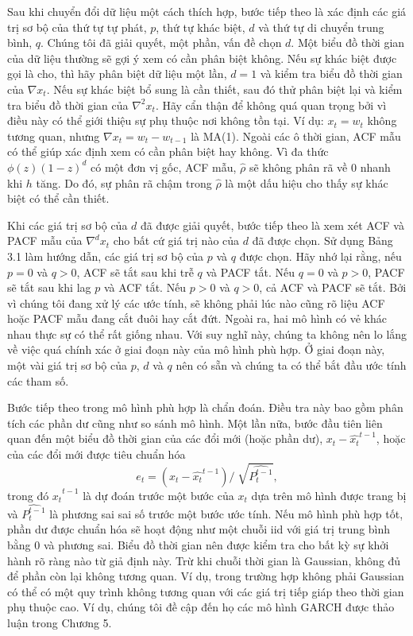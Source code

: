 \documentclass[12pt, a4paper,oneside]{book}
\theoremstyle{definition}
\begin{document}
Sau khi chuyển đổi dữ liệu một cách thích hợp, bước tiếp theo là xác định các giá trị sơ bộ của thứ tự tự phát, $p$, thứ tự khác biệt, $d$ và thứ tự di chuyển trung bình, $q$. Chúng tôi đã giải quyết, một phần, vấn đề chọn $d$. Một biểu đồ thời gian của dữ liệu thường sẽ gợi ý xem có cần phân biệt không. Nếu sự khác biệt được gọi là cho, thì hãy phân biệt dữ liệu một lần, $d = 1$ và kiểm tra biểu đồ thời gian của $\nabla x_{t}$. Nếu sự khác biệt bổ sung là cần thiết, sau đó thử phân biệt lại và kiểm tra biểu đồ thời gian của $\nabla^{2}x_{t}$. Hãy cẩn thận để không quá quan trọng bởi vì điều này có thể giới thiệu sự phụ thuộc nơi không tồn tại. Ví dụ: $x_{t}=w_{t}$ không tương quan, nhưng $\nabla x_{t} = w_{t}-w_{t-1}$ là MA(1). Ngoài các ô thời gian, ACF mẫu có thể giúp xác định xem có cần phân biệt hay không. Vì đa thức $\phi(z)(1-z)^{d}$ có một đơn vị gốc, ACF mẫu, $\hat{\rho}$ sẽ không phân rã về 0 nhanh khi $h$ tăng. Do đó, sự phân rã chậm trong $\hat{\rho}$ là một dấu hiệu cho thấy sự khác biệt có thể cần thiết. 

Khi các giá trị sơ bộ của $d$ đã được giải quyết, bước tiếp theo là xem xét ACF và PACF mẫu của $\nabla^{d}x_{t}$ cho bất cứ giá trị nào của $d$ đã được chọn. Sử dụng Bảng 3.1 làm hướng dẫn, các giá trị sơ bộ của $p$ và $q$ được chọn. Hãy nhớ lại rằng, nếu $p = 0$ và $q> 0$, ACF sẽ tắt sau khi trễ $q$ và PACF tắt. Nếu $q = 0$ và $p> 0$, PACF sẽ tắt sau khi lag $p$ và ACF tắt. Nếu $p> 0$ và $q> 0$, cả ACF và PACF sẽ tắt. Bởi vì chúng tôi đang xử lý các ước tính, sẽ không phải lúc nào cũng rõ liệu ACF hoặc PACF mẫu đang cắt đuôi hay cắt đứt. Ngoài ra, hai mô hình có vẻ khác nhau thực sự có thể rất giống nhau. Với suy nghĩ này, chúng ta không nên lo lắng về việc quá chính xác ở giai đoạn này của mô hình phù hợp. Ở giai đoạn này, một vài giá trị sơ bộ của $p$, $d$ và $q$ nên có sẵn và chúng ta có thể bắt đầu ước tính các tham số.

Bước tiếp theo trong mô hình phù hợp là chẩn đoán. Điều tra này bao gồm phân tích các phần dư cũng như so sánh mô hình. Một lần nữa, bước đầu tiên liên quan đến một biểu đồ thời gian của các đổi mới (hoặc phần dư), $x_{t}-\hat{x_{t}}^{t-1}$, hoặc của các đổi mới được tiêu chuẩn hóa
$$e_{t}= (x_{t}-\hat{x_{t}}^{t-1})/\sqrt[]{\hat{P_t^{t-1}}},$$
trong đó $\hat{x_{t}}^{t-1}$ là dự đoán trước một bước của $x_{t}$ dựa trên mô hình được trang bị và $\hat{P_t^{t-1}}$ là phương sai sai số trước một bước ước tính. Nếu mô hình phù hợp tốt, phần dư được chuẩn hóa sẽ hoạt động như một chuỗi iid với giá trị trung bình bằng 0 và phương sai. Biểu đồ thời gian nên được kiểm tra cho bất kỳ sự khởi hành rõ ràng nào từ giả định này. Trừ khi chuỗi thời gian là Gaussian, không đủ để phần còn lại không tương quan. Ví dụ, trong trường hợp không phải Gaussian có thể có một quy trình không tương quan với các giá trị tiếp giáp theo thời gian phụ thuộc cao. Ví dụ, chúng tôi đề cập đến họ các mô hình GARCH được thảo luận trong Chương 5.
\end{document}
